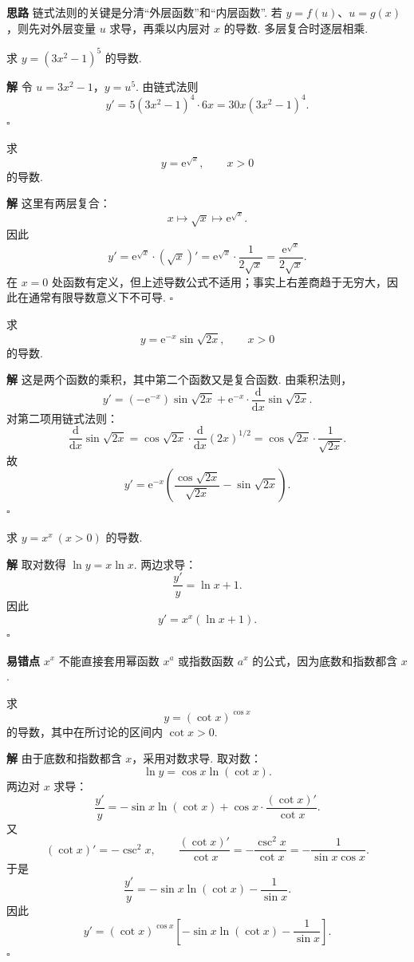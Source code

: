 \documentclass[fontset=fandol]{ctexart}
\newenvironment{solution}{\par\noindent\textbf{解}\quad}{\hfill$\square$\par\vspace{0.8em}}
\newenvironment{idea}{\par\noindent\textbf{思路}\quad}{\par\vspace{0.4em}}
\newenvironment{warning}{\par\noindent\textbf{易错点}\quad}{\par\vspace{0.8em}}
\newcommand{\dd}{\mathrm{d}}
\newcommand{\ee}{\mathrm{e}}
\begin{document}
\begin{idea}
链式法则的关键是分清“外层函数”和“内层函数”. 若 $y=f(u)$、$u=g(x)$，则先对外层变量 $u$ 求导，再乘以内层对 $x$ 的导数. 多层复合时逐层相乘.
\end{idea}

\begin{example}[公式求导]
求 $y=(3x^2-1)^5$ 的导数.
\end{example}
\begin{solution}
令 $u=3x^2-1$，$y=u^5$. 由链式法则
\[
y'=5(3x^2-1)^4\cdot6x=30x(3x^2-1)^4.
\]
\end{solution}

\begin{example}[多层复合求导]
求
\[
y=\ee^{\sqrt{x}},\qquad x>0
\]
的导数.
\end{example}
\begin{solution}
这里有两层复合：
\[
x\longmapsto \sqrt{x}\longmapsto \ee^{\sqrt{x}}.
\]
因此
\[
y'=\ee^{\sqrt{x}}\cdot(\sqrt{x})'
=\ee^{\sqrt{x}}\cdot\frac{1}{2\sqrt{x}}
=\frac{\ee^{\sqrt{x}}}{2\sqrt{x}}.
\]
在 $x=0$ 处函数有定义，但上述导数公式不适用；事实上右差商趋于无穷大，因此在通常有限导数意义下不可导.
\end{solution}

\begin{example}[复合与乘积同时出现]
求
\[
y=\ee^{-x}\sin\sqrt{2x},\qquad x>0
\]
的导数.
\end{example}
\begin{solution}
这是两个函数的乘积，其中第二个函数又是复合函数. 由乘积法则，
\[
y'=(-\ee^{-x})\sin\sqrt{2x}
+\ee^{-x}\cdot\frac{\dd}{\dd x}\sin\sqrt{2x}.
\]
对第二项用链式法则：
\[
\frac{\dd}{\dd x}\sin\sqrt{2x}
=\cos\sqrt{2x}\cdot\frac{\dd}{\dd x}(2x)^{1/2}
=\cos\sqrt{2x}\cdot\frac1{\sqrt{2x}}.
\]
故
\[
y'=\ee^{-x}\left(\frac{\cos\sqrt{2x}}{\sqrt{2x}}-\sin\sqrt{2x}\right).
\]
\end{solution}

\begin{example}[对数求导]
求 $y=x^x\ (x>0)$ 的导数.
\end{example}
\begin{solution}
取对数得 $\ln y=x\ln x$. 两边求导：
\[
\frac{y'}{y}=\ln x+1.
\]
因此
\[
y'=x^x(\ln x+1).
\]
\end{solution}
\begin{warning}
$x^x$ 不能直接套用幂函数 $x^a$ 或指数函数 $a^x$ 的公式，因为底数和指数都含 $x$.
\end{warning}

\begin{example}[变底变指数函数]
求
\[
y=(\cot x)^{\cos x}
\]
的导数，其中在所讨论的区间内 $\cot x>0$.
\end{example}
\begin{solution}
由于底数和指数都含 $x$，采用对数求导. 取对数：
\[
\ln y=\cos x\ln(\cot x).
\]
两边对 $x$ 求导：
\[
\frac{y'}{y}
=-\sin x\ln(\cot x)+\cos x\cdot\frac{(\cot x)'}{\cot x}.
\]
又
\[
(\cot x)'=-\csc^2x,\qquad
\frac{(\cot x)'}{\cot x}
=-\frac{\csc^2x}{\cot x}
=-\frac{1}{\sin x\cos x}.
\]
于是
\[
\frac{y'}{y}
=-\sin x\ln(\cot x)-\frac1{\sin x}.
\]
因此
\[
y'=(\cot x)^{\cos x}\left[-\sin x\ln(\cot x)-\frac1{\sin x}\right].
\]
\end{solution}
\end{document}
